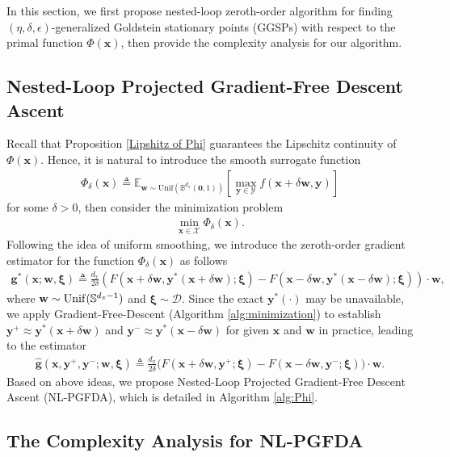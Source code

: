 \documentclass[11pt]{article}
\def\vzero{\mathbf{0}}
\def\vg{\mathbf{g}}
\def\vw{\mathbf{w}}
\def\vx{\mathbf{x}}
\def\vy{\mathbf{y}}
\def\vxi{\bm{\xi}}
\def\fD{{\mathcal{D}}}
\def\fX{{\mathcal{X}}}
\def\fY{{\mathcal{Y}}}
\def\BE{{\mathbb{E}}}
\def\BB{{\mathbb{B}}}
\begin{document}
In this section, we first propose nested-loop zeroth-order algorithm for 
finding $(\eta,\delta,\epsilon)$-generalized Goldstein stationary points (GGSPs) with respect to the primal function $\Phi(\vx)$, 
then provide the complexity analysis for our algorithm. 

\subsection{Nested-Loop Projected Gradient-Free Descent Ascent}

Recall that Proposition \ref{Lipshitz of Phi} guarantees the Lipschitz continuity of $\Phi(\vx)$. Hence, it is natural to introduce the smooth surrogate function   
\begin{align}\label{def of Phi_delta}
 \Phi_\delta(\vx) \triangleq \BE_{\vw\sim {\mathrm{Unif}}(\BB^{d_x}(\vzero,1))}\left[\max_{\vy \in \fY} f(\vx+\delta\vw, \vy)\right]   
\end{align}
for some $\delta>0$, then consider the minimization problem
\begin{align*}
    \min_{\vx\in\fX} \Phi_\delta(\vx).
\end{align*}
Following the idea of uniform smoothing, we introduce the zeroth-order gradient estimator for the function $\Phi_\delta(\vx)$ as follows
\begin{align*}
\vg^*(\vx;\vw,\vxi) \triangleq \frac{d_x}{2\delta}(F(\vx+\delta\vw, \vy^*(\vx+\delta\vw);\vxi)-F(\vx-\delta\vw,\vy^*(\vx-\delta\vw);\vxi))\cdot\vw,
\end{align*}
where $\vw\sim{\rm Unif}(\mathbb{S}^{d_x-1})$ and $\vxi\sim\fD$.
Since the exact $\vy^*(\cdot)$ may be unavailable, we apply Gradient-Free-Descent (Algorithm \ref{alg:minimization}) to establish $\vy^+\approx\vy^*(\vx+\delta\vw)$ and $\vy^-\approx\vy^*(\vx-\delta\vw)$ for given $\vx$ and $\vw$ in practice, leading to the estimator
\begin{align*}
    \hat{\vg}(\vx,\vy^+,\vy^-;\vw,\vxi) \triangleq  \frac{d_x}{2\delta}\big(F(\vx+\delta\vw,\vy^+;\vxi) - F(\vx-\delta\vw,\vy^-;\vxi)\big)\cdot\vw.
\end{align*}
Based on above ideas, we propose Nested-Loop Projected Gradient-Free Descent Ascent (NL-PGFDA), which is detailed in Algorithm \ref{alg:Phi}.

\subsection{The Complexity Analysis for NL-PGFDA}\label{sec:convergence NL-PGFDA}
\end{document}
